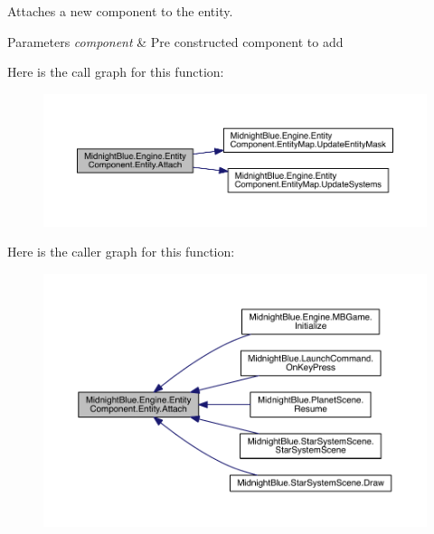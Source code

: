 Attaches a new component to the entity. 


\begin{DoxyParams}{Parameters}
{\em component} & Pre constructed component to add\\
\hline
\end{DoxyParams}
Here is the call graph for this function\+:
\nopagebreak
\begin{figure}[H]
\begin{center}
\leavevmode
\includegraphics[width=350pt]{class_midnight_blue_1_1_engine_1_1_entity_component_1_1_entity_a03dd4fbb29f2a0be51589726304725df_cgraph}
\end{center}
\end{figure}
Here is the caller graph for this function\+:
\nopagebreak
\begin{figure}[H]
\begin{center}
\leavevmode
\includegraphics[width=350pt]{class_midnight_blue_1_1_engine_1_1_entity_component_1_1_entity_a03dd4fbb29f2a0be51589726304725df_icgraph}
\end{center}
\end{figure}
\hypertarget{class_midnight_blue_1_1_engine_1_1_entity_component_1_1_entity_ac0f755703d44843aff237147fa2f49ff}{}\label{class_midnight_blue_1_1_engine_1_1_entity_component_1_1_entity_ac0f755703d44843aff237147fa2f49ff} 
